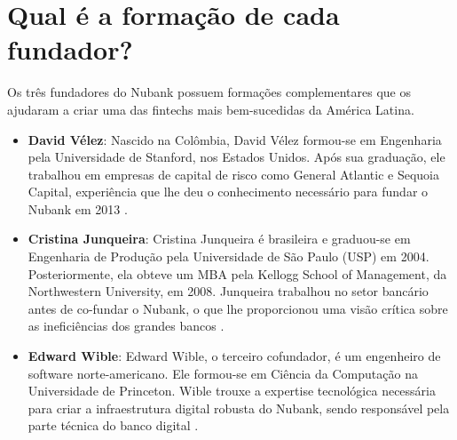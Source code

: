\section{Qual é a formação de cada fundador?}

Os três fundadores do Nubank possuem formações complementares que os ajudaram a criar uma das fintechs mais bem-sucedidas da América Latina.



\begin{itemize}
    \item \textbf{David Vélez}: Nascido na Colômbia, David Vélez formou-se em Engenharia pela Universidade de Stanford, nos Estados Unidos. Após sua graduação, ele trabalhou em empresas de capital de risco como General Atlantic e Sequoia Capital, experiência que lhe deu o conhecimento necessário para fundar o Nubank em 2013 \cite{velez2024}.

    \item \textbf{Cristina Junqueira}: Cristina Junqueira é brasileira e graduou-se em Engenharia de Produção pela Universidade de São Paulo (USP) em 2004. Posteriormente, ela obteve um MBA pela Kellogg School of Management, da Northwestern University, em 2008. Junqueira trabalhou no setor bancário antes de co-fundar o Nubank, o que lhe proporcionou uma visão crítica sobre as ineficiências dos grandes bancos \cite{junqueira2024}.

    \item \textbf{Edward Wible}: Edward Wible, o terceiro cofundador, é um engenheiro de software norte-americano. Ele formou-se em Ciência da Computação na Universidade de Princeton. Wible trouxe a expertise tecnológica necessária para criar a infraestrutura digital robusta do Nubank, sendo responsável pela parte técnica do banco digital \cite{wible2024}.
\end{itemize}